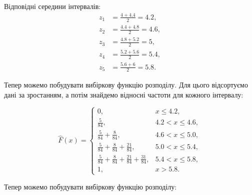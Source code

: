 \documentclass{hw_template}
\begin{document}
Відповідні середини інтервалів:
\begin{equation*}
    \begin{aligned}
        z_1 &= \frac{4+4.4}{2} = 4.2, \\
        z_2 &= \frac{4.4+4.8}{2} = 4.6, \\
        z_3 &= \frac{4.8+5.2}{2} = 5, \\
        z_4 &= \frac{5.2+5.6}{2} = 5.4, \\
        z_5 &= \frac{5.6+6}{2} = 5.8.
    \end{aligned}
\end{equation*}

Тепер можемо побудувати вибіркову функцію розподілу. Для цього відсортуємо дані за зростанням, а потім знайдемо відносні частоти для кожного інтервалу:

\begin{equation*}
    \hat{F}(x) = \begin{cases}
        0, & x \leq 4.2, \\
        \frac{5}{84}, & 4.2 < x \leq 4.6, \\
        \frac{5}{84} + \frac{8}{84}, & 4.6 < x \leq 5.0, \\
        \frac{5}{84} + \frac{8}{84} + \frac{21}{84}, & 5.0 < x \leq 5.4, \\
        \frac{5}{84} + \frac{8}{84} + \frac{21}{84} + \frac{31}{84}, & 5.4 < x \leq 5.8, \\
        1, & x > 5.8.
    \end{cases}
\end{equation*}

Тепер можемо побудувати вибіркову функцію розподілу:
\end{document}
